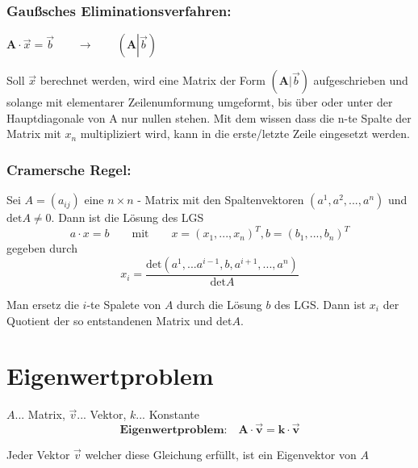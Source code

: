 \subsubsection{Gaußsches Eliminationsverfahren:}

$\mathbf{A}\cdot \vec{x} =\vec{b}\qquad\rightarrow \qquad \left (\mathbf{A} \left | \vec{b}\right ) \right .$

Soll $\vec{x}$ berechnet werden, wird eine Matrix der Form $(\mathbf{A}|\vec{b})$ aufgeschrieben und solange mit elementarer Zeilenumformung umgeformt, bis über oder unter der Hauptdiagonale von A nur nullen stehen. Mit dem wissen dass die n-te Spalte der Matrix mit $x_n$ multipliziert wird, kann in die erste/letzte Zeile eingesetzt werden.


\subsubsection{Cramersche Regel:}
Sei $A=(a_{ij})$ eine $n\times n$ - Matrix mit den Spaltenvektoren $(a^1,a^2,...,a^n)$ und $\text{det}A\neq 0$. Dann ist die Lösung des LGS
\[a\cdot x = b \qquad \text{mit} \qquad x = (x_1, ... , x_n)^T, b=(b_1,...,b_n)^T\]
gegeben durch
\[x_i=\frac{\text{det}(a^1,...a^{i-1}, b, a^{i+1},...,a^n)}{\text{det}A}\]

Man ersetz die $i$-te Spalete von $A$ durch die Lösung $b$ des LGS. Dann ist $x_i$ der Quotient der so entstandenen Matrix und det$A$.

\section{Eigenwertproblem}
$A$... Matrix, $\vec{v}$... Vektor, $k$... Konstante\\
\[\textbf{Eigenwertproblem:}\quad \bm{A\cdot \vec{v} = k \cdot \vec{v}}\]

Jeder Vektor $\vec{v}$ welcher diese Gleichung erfüllt, ist ein Eigenvektor von $A$